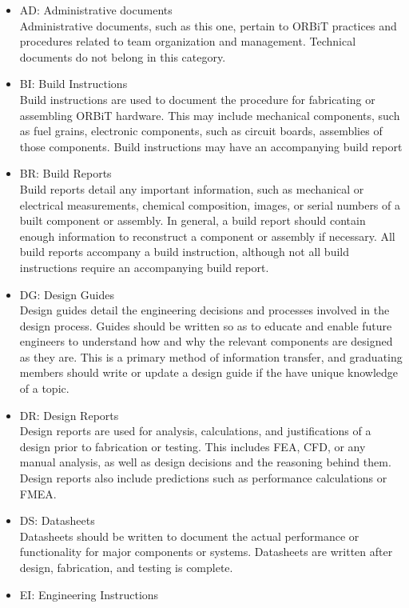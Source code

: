 \documentclass[12pt,article]{memoir}
\begin{document}
\begin{itemize}
\item AD: Administrative documents\\
Administrative documents, such as this one, pertain to ORBiT practices and procedures related to team organization and management. Technical documents do not belong in this category.
\item BI: Build Instructions\\
Build instructions are used to document the procedure for fabricating or assembling ORBiT hardware. This may include mechanical components, such as fuel grains, electronic components, such as circuit boards, assemblies of those components. Build instructions may have an accompanying build report
\item BR: Build Reports\\
Build reports detail any important information, such as mechanical or electrical measurements, chemical composition, images, or serial numbers of a built component or assembly. In general, a build report should contain enough information to reconstruct a component or assembly if necessary. All build reports accompany a build instruction, although not all build instructions require an accompanying build report.
\item DG: Design Guides\\
Design guides detail the engineering decisions and processes involved in the design process. Guides should be written so as to educate and enable future engineers to understand how and why the relevant components are designed as they are. This is a primary method of information transfer, and graduating members should write or update a design guide if the have unique knowledge of a topic.
\item DR: Design Reports\\
Design reports are used for analysis, calculations, and justifications of a design prior to fabrication or testing. This includes FEA, CFD, or any manual analysis, as well as design decisions and the reasoning behind them. Design reports also include predictions such as performance calculations or FMEA.
\item DS: Datasheets\\
Datasheets should be written to document the actual performance or functionality for major components or systems. Datasheets are written after design, fabrication, and testing is complete.
\item EI: Engineering Instructions\\

\end{itemize}
\end{document}
